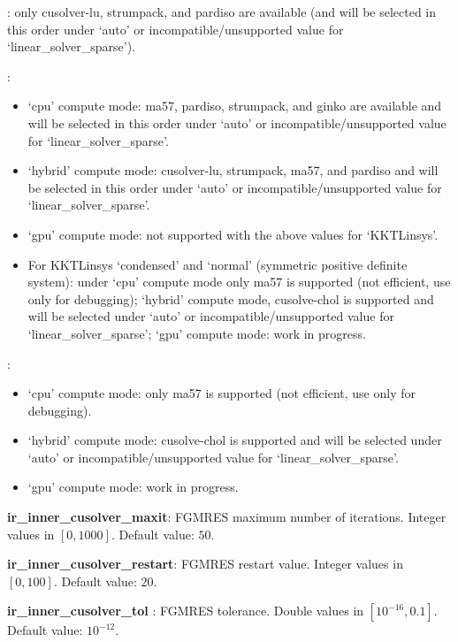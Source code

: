 : only cusolver-lu, strumpack, and pardiso are available (and will be selected in this order under `auto' or incompatible/unsupported value for `linear\_solver\_sparse').

: 
\begin{itemize}
  \item `cpu' compute mode: ma57, pardiso, strumpack, and ginko are available and will be selected in this order under `auto' or incompatible/unsupported value for `linear\_solver\_sparse'.
  \item `hybrid' compute mode: cusolver-lu, strumpack, ma57, and pardiso and will be selected in this order under `auto' or incompatible/unsupported value for `linear\_solver\_sparse'.
  \item `gpu' compute mode: not supported with the above values for `KKTLinsys'.
  \item For KKTLinsys `condensed' and `normal' (symmetric positive definite system): under `cpu' compute mode only ma57 is supported (not efficient, use only for debugging); `hybrid' compute mode, cusolve-chol is supported and will be selected under `auto' or incompatible/unsupported value for `linear\_solver\_sparse'; `gpu' compute mode: work in progress.
\end{itemize}

: 
\begin{itemize}
  \item `cpu' compute mode: only ma57 is supported (not efficient, use only for debugging).
  \item `hybrid' compute mode: cusolve-chol is supported and will be selected under `auto' or incompatible/unsupported value for `linear\_solver\_sparse'.
  \item `gpu' compute mode: work in progress.
\end{itemize}

\noindent \textbf{ir\_inner\_cusolver\_maxit}: FGMRES maximum number of iterations. Integer values in $[0, 1000]$. Default value: $50$.
\medskip

\noindent \textbf{ir\_inner\_cusolver\_restart}: FGMRES restart value. Integer values in $[0, 100]$. Default value: $20$.
\medskip

\noindent \textbf{ir\_inner\_cusolver\_tol }: FGMRES tolerance. Double values in $[10^{-16}, 0.1]$. Default value: $10^{-12}$.
\medskip

